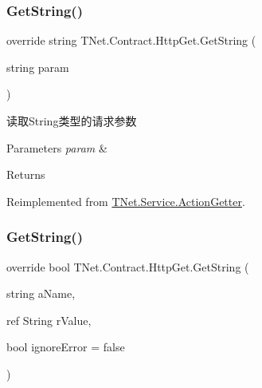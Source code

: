 \subsubsection{\texorpdfstring{Get\+String()}{GetString()}\hspace{0.1cm}{\footnotesize\ttfamily [1/3]}}
{\footnotesize\ttfamily override string T\+Net.\+Contract.\+Http\+Get.\+Get\+String (\begin{DoxyParamCaption}\item[{string}]{param }\end{DoxyParamCaption})\hspace{0.3cm}{\ttfamily [virtual]}}



读取\+String类型的请求参数 


\begin{DoxyParams}{Parameters}
{\em param} & \\
\hline
\end{DoxyParams}
\begin{DoxyReturn}{Returns}

\end{DoxyReturn}


Reimplemented from \mbox{\hyperlink{class_t_net_1_1_service_1_1_action_getter_abe969bc31489bbeff2c777a971fdb760}{T\+Net.\+Service.\+Action\+Getter}}.

\mbox{\label{class_t_net_1_1_contract_1_1_http_get_ade64b775a2fe61cac8737571ab66d7e2}} 
\subsubsection{\texorpdfstring{Get\+String()}{GetString()}\hspace{0.1cm}{\footnotesize\ttfamily [2/3]}}
{\footnotesize\ttfamily override bool T\+Net.\+Contract.\+Http\+Get.\+Get\+String (\begin{DoxyParamCaption}\item[{string}]{a\+Name,  }\item[{ref String}]{r\+Value,  }\item[{bool}]{ignore\+Error = {\ttfamily false} }\end{DoxyParamCaption})\hspace{0.3cm}{\ttfamily [virtual]}}



